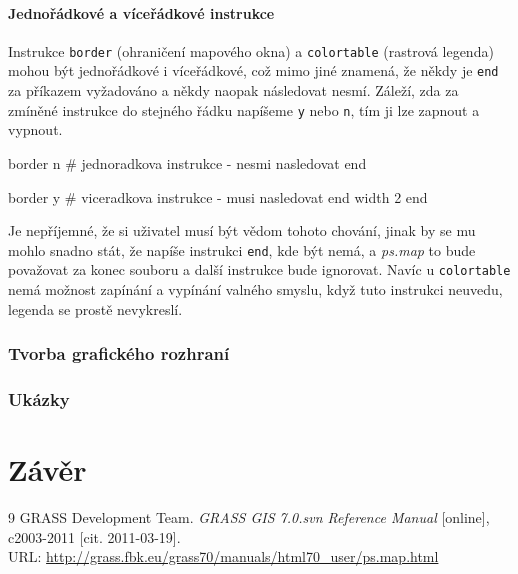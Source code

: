 \documentclass[a4paper,12pt,draft]{article}
\newcommand{\modul}[1]{\emph{#1}}
\newcommand{\instr}[1]{\lstinline[style=psmapInline]{#1}}
\begin{document}
\paragraph*{Jednořádkové a víceřádkové instrukce}
\label{sec:psmap:singleline}
Instrukce \instr{border} (ohraničení mapového okna) a \instr{colortable} (rastrová legenda) mohou být jednořádkové i víceřádkové, což mimo jiné znamená, že někdy je \instr{end} za příkazem vyžadováno a někdy naopak následovat nesmí. Záleží, zda za zmíněné instrukce do stejného řádku napíšeme \instr{y} nebo \instr{n}, tím ji lze zapnout a vypnout. 
\begin{psmap}
border n    # jednoradkova instrukce - nesmi nasledovat end

border y    # viceradkova instrukce - musi nasledovat end
   width 2
end
\end{psmap}
Je nepříjemné, že si uživatel musí být vědom tohoto chování, jinak by se mu mohlo snadno stát, že napíše instrukci \instr{end}, kde být nemá, a \modul{ps.map} to bude považovat za konec souboru a další instrukce bude ignorovat.
Navíc u \instr{colortable} nemá možnost zapínání a vypínání valného smyslu, když tuto instrukci neuvedu, legenda se prostě nevykreslí.

\subsubsection{Tvorba grafického rozhraní}
\subsubsection{Ukázky}

\section{Závěr}

\begin{thebibliography}{9}
\label{literatura}
 GRASS Development Team. \textit{GRASS GIS 7.0.svn Reference Manual} [online], c2003-2011 [cit. 2011-03-19].\\ URL: \url{http://grass.fbk.eu/grass70/manuals/html70_user/ps.map.html}
\end{thebibliography}
\end{document}
